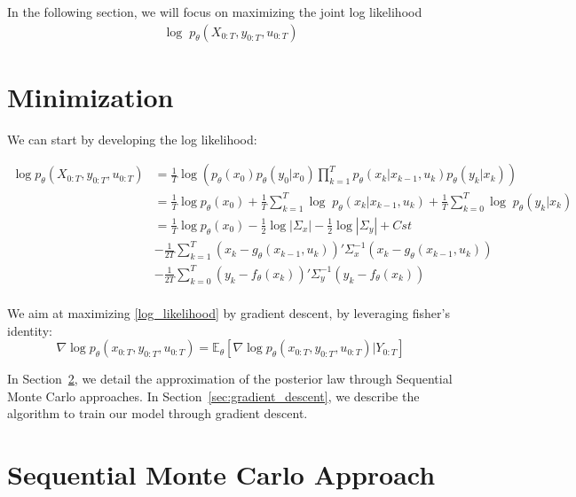 \documentclass[10pt,a4paper]{report}
\begin{document}
In the following section, we will focus on maximizing the joint log likelihood
\begin{align}
        \log \; p_{\theta}(X_{0:T}, y_{0:T}, u_{0:T})
        \label{log_likelihood}
\end{align}

\section{Minimization}
We can start by developing the log likelihood:

\begin{align*}
        \log p_{\theta}(X_{0:T}, y_{0:T}, u_{0:T}) & = \frac{1}{T} \log\left(p_\theta(x_0)p_\theta(y_0 | x_0)\prod_{k=1}^{T} p_{\theta}(x_k | x_{k-1}, u_k) p_{\theta}(y_k | x_k)\right)                             \\
                                                   & = \frac{1}{T} \log p_\theta(x_0) + \frac{1}{T} \sum_{k=1}^{T} \log \; p_{\theta}(x_k | x_{k-1}, u_k) + \frac{1}{T} \sum_{k=0}^{T} \log \; p_{\theta}(y_k | x_k) \\
                                                   & = \frac{1}{T} \log p_\theta(x_0) -\frac{1}{2} \log|\Sigma_x| -\frac{1}{2} \log|\Sigma_y| + Cst                                                                  \\
                                                   & - \frac{1}{2T} \sum_{k=1}^{T}(x_k - g_\theta(x_{k-1}, u_{k}))' \Sigma_x^{-1} (x_k - g_\theta(x_{k-1}, u_{k}))                                                   \\
                                                   & - \frac{1}{2T} \sum_{k=0}^{T}(y_k - f_\theta(x_k))' \Sigma_y^{-1} (y_k - f_\theta(x_k))                                                                         \\
\end{align*}

We aim at maximizing \ref{log_likelihood} by gradient descent, by leveraging fisher's identity:
$$
        \nabla \log p_\theta(x_{0:T}, y_{0:T}, u_{0:T}) = \mathbb{E}_\theta \left[ \nabla\log p_\theta(x_{0:T}, y_{0:T}, u_{0:T}) | Y_{0:T} \right]
$$

In Section~\ref{sec:smc}, we detail the approximation of the posterior law through Sequential Monte Carlo approaches.
In Section~\ref{sec:gradient_descent}, we describe the algorithm to train our model through gradient descent.


\section{Sequential Monte Carlo Approach}
\label{sec:smc}
\end{document}

